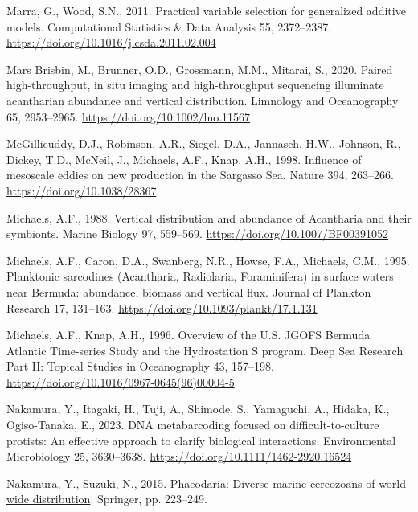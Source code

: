 \documentclass[
]{article}
\newlength{\cslhangindent}
\newlength{\cslentryspacingunit} %
\newenvironment{CSLReferences}[2] %
 {%
  \setlength{\parindent}{0pt}
  \ifodd #1
  \let\oldpar\par
  \def\par{\hangindent=\cslhangindent\oldpar}
  \fi
  \setlength{\parskip}{#2\cslentryspacingunit}
 }%
 {}
\begin{document}
\begin{CSLReferences}{1}{0}
\leavevmode{}%
Marra, G., Wood, S.N., 2011. Practical variable selection for
generalized additive models. Computational Statistics \& Data Analysis
55, 2372--2387. \url{https://doi.org/10.1016/j.csda.2011.02.004}

\leavevmode{}%
Mars Brisbin, M., Brunner, O.D., Grossmann, M.M., Mitarai, S., 2020.
Paired high-throughput, in situ imaging and high-throughput sequencing
illuminate acantharian abundance and vertical distribution. Limnology
and Oceanography 65, 2953--2965. \url{https://doi.org/10.1002/lno.11567}

\leavevmode{}%
McGillicuddy, D.J., Robinson, A.R., Siegel, D.A., Jannasch, H.W.,
Johnson, R., Dickey, T.D., McNeil, J., Michaels, A.F., Knap, A.H., 1998.
Influence of mesoscale eddies on new production in the Sargasso Sea.
Nature 394, 263--266. \url{https://doi.org/10.1038/28367}

\leavevmode{}%
Michaels, A.F., 1988. Vertical distribution and abundance of Acantharia
and their symbionts. Marine Biology 97, 559--569.
\url{https://doi.org/10.1007/BF00391052}

\leavevmode{}%
Michaels, A.F., Caron, D.A., Swanberg, N.R., Howse, F.A., Michaels,
C.M., 1995. Planktonic sarcodines (Acantharia, Radiolaria, Foraminifera)
in surface waters near Bermuda: abundance, biomass and vertical flux.
Journal of Plankton Research 17, 131--163.
\url{https://doi.org/10.1093/plankt/17.1.131}

\leavevmode{}%
Michaels, A.F., Knap, A.H., 1996. Overview of the U.S. JGOFS Bermuda
Atlantic Time-series Study and the Hydrostation S program. Deep Sea
Research Part II: Topical Studies in Oceanography 43, 157--198.
\url{https://doi.org/10.1016/0967-0645(96)00004-5}

\leavevmode{}%
Nakamura, Y., Itagaki, H., Tuji, A., Shimode, S., Yamaguchi, A., Hidaka,
K., Ogiso-Tanaka, E., 2023. DNA metabarcoding focused on
difficult-to-culture protists: An effective approach to clarify
biological interactions. Environmental Microbiology 25, 3630--3638.
\url{https://doi.org/10.1111/1462-2920.16524}

\leavevmode{}%
Nakamura, Y., Suzuki, N., 2015.
\href{https://link.springer.com/chapter/10.1007/978-4-431-55130-0_9}{Phaeodaria:
Diverse marine cercozoans of world-wide distribution}. Springer, pp.
223--249.


\end{CSLReferences}
\end{document}
